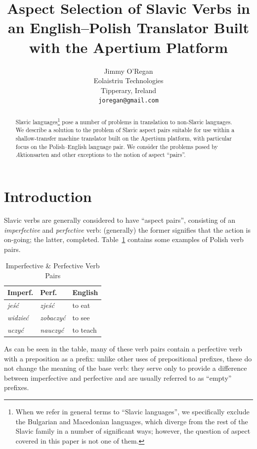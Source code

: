 \documentclass[11pt]{article}
\author{Jimmy O'Regan\\  Eolaistriu Technologies \\  Tipperary, Ireland \\  {\tt \small   joregan@gmail.com} }
\title{Aspect Selection of Slavic Verbs in an English--Polish Translator Built with the Apertium Platform}
\begin{document}
\maketitle

  \begin{abstract}
   Slavic languages\footnote{
   When we refer in general terms to ``Slavic languages'', we specifically exclude 
   the Bulgarian and Macedonian languages, which diverge from 
   the rest of the Slavic family in a number of significant ways;
   however, the question of aspect covered in this paper is not
   one of them.} 
   pose a number of problems in translation to non-Slavic
   languages. We describe a solution to the problem of Slavic aspect pairs
   suitable for use within a shallow-transfer machine translator
   built on the Apertium platform, with particular focus on the
   Polish--English language pair. We consider the problems posed
   by {\emph Aktionsarten} and other exceptions to the notion of
   aspect ``pairs''.
  \end{abstract}

\section{Introduction}
Slavic verbs are generally considered to have ``aspect pairs'',
consisting of an {\it imperfective} and {\it perfective} verb: 
(generally) the former signifies that the action is on-going; 
the latter, completed. Table~\ref{table:vbpairs} contains
some examples of Polish verb pairs.

\begin{table}[htdp]
\caption{Imperfective \& Perfective Verb Pairs}
\label{table:vbpairs}
\begin{center}
\begin{tabular}{|l|l|l|}
\hline
{\sc Imperf.} & {\sc Perf.} & English \\
\hline
{\it je{\'s\'c}} & {\it zje{\'s\'c}} & to eat \\
{\it widzie{\'c}} & {\it zobaczy{\'c}} & to see \\
{\it uczy{\'c}} & {\it nauczy{\'c}} & to teach \\
\hline
\end{tabular}
\end{center}
\end{table}

As can be seen in the table, many of these verb pairs contain
a perfective verb with a preposition as a prefix: unlike other
uses of prepositional prefixes, these do not change the meaning
of the base verb: they serve only to provide a difference 
between imperfective and perfective and are usually referred to as
``empty'' prefixes.
\end{document}

